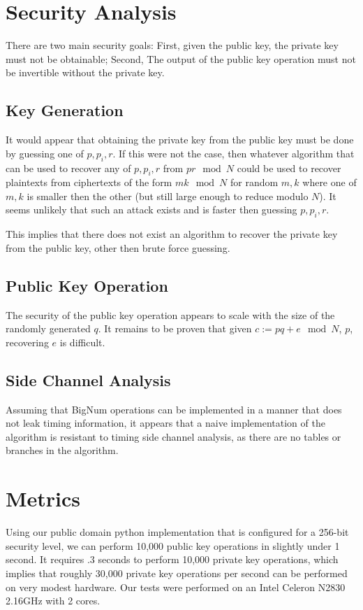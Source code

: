 \documentclass[preprint]{iacrtrans}
\begin{document}
\section{Security Analysis}
There are two main security goals: First, given the public key, the private key must not be obtainable; Second, The output of the public key operation must not be invertible without the private key.

\subsection{Key Generation}
It would appear that obtaining the private key from the public key must be done by guessing one of $p, p_i, r$. If this were not the case, then whatever algorithm that can be used to recover any of $p, p_i, r$ from $p r \mod N$ could be used to recover plaintexts from ciphertexts of the form $m k \mod N$ for random $m, k$ where one of $m, k$ is smaller then the other (but still large enough to reduce modulo $N$). It seems unlikely that such an attack exists and is faster then guessing $p, p_i,  r$. 

This implies that there does not exist an algorithm to recover the private key from the public key, other then brute force guessing.

\subsection{Public Key Operation}
The security of the public key operation appears to scale with the size of the randomly generated $q$. It remains to be proven that given $c := p q + e \mod N$, $p$, recovering $e$ is difficult.

\subsection{Side Channel Analysis}
Assuming that BigNum operations can be implemented in a manner that does not leak timing information, it appears that a naive implementation of the algorithm is resistant to timing side channel analysis, as there are no tables or branches in the algorithm.

\section{Metrics}
Using our public domain python implementation that is configured for a 256-bit security level, we can perform 10,000 public key operations in slightly under 1 second. It requires .3 seconds to perform 10,000 private key operations, which implies that roughly 30,000 private key operations per second can be performed on very modest hardware. Our tests were performed on an Intel Celeron N2830 2.16GHz with 2 cores. 
\end{document}

